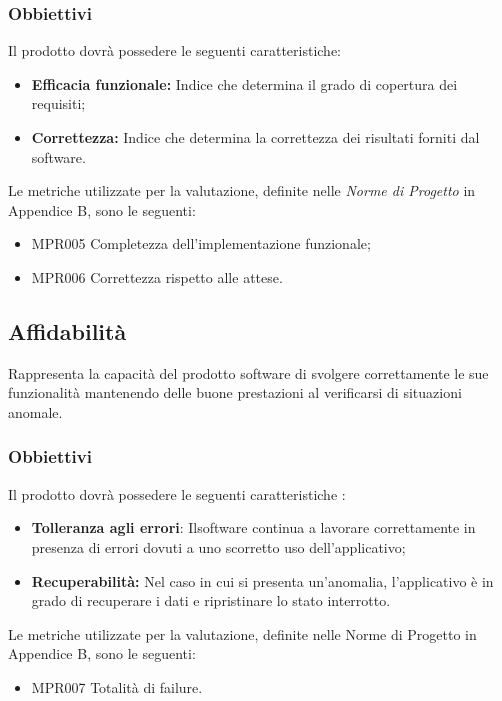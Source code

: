 \subsubsection{Obbiettivi }Il prodotto dovrà possedere le seguenti caratteristiche:
\begin{itemize}
	\item \textbf{Efficacia funzionale:} Indice che determina il grado di copertura dei requisiti;
	\item \textbf{Correttezza:} Indice che determina la correttezza dei risultati forniti dal software.
\end{itemize}

Le metriche utilizzate per la valutazione, definite nelle \textit{Norme di Progetto} in Appendice B, sono le seguenti:
\begin{itemize}
	\item MPR005 Completezza dell'implementazione funzionale;
	\item MPR006 Correttezza rispetto alle attese.
\end{itemize}

\subsection{Affidabilità}
Rappresenta la capacità del prodotto software di svolgere correttamente le sue funzionalità mantenendo delle buone prestazioni al verificarsi di situazioni anomale.

\subsubsection{Obbiettivi} Il prodotto dovrà possedere le seguenti caratteristiche :
\begin{itemize}
	\item \textbf{Tolleranza agli errori}: Ilsoftware continua a lavorare correttamente in presenza di errori dovuti a uno scorretto uso dell'applicativo;
	\item \textbf{Recuperabilità:} Nel caso in cui si presenta un'anomalia, l'applicativo è in grado di recuperare i dati e ripristinare lo stato interrotto.
\end{itemize}

Le metriche utilizzate per la valutazione, definite nelle Norme di Progetto in Appendice B, sono le seguenti:
\begin{itemize}
	\item MPR007 Totalità di failure.
\end{itemize}


